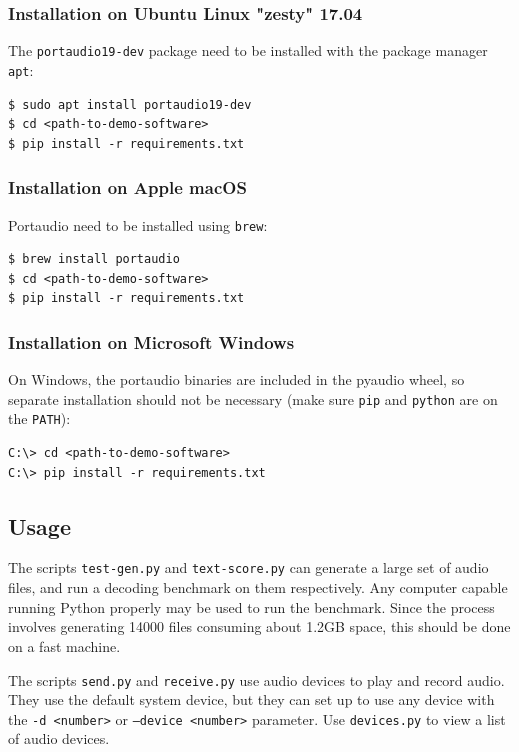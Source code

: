 \documentclass[a4paper]{article}
\begin{document}
\subsubsection{Installation on Ubuntu Linux "zesty" 17.04}

The \texttt{portaudio19-dev} package need to be installed with the 
package manager \texttt{apt}:

\begin{lstlisting}
$ sudo apt install portaudio19-dev
$ cd <path-to-demo-software>
$ pip install -r requirements.txt
\end{lstlisting}

\subsubsection{Installation on Apple macOS}

Portaudio need to be installed using \texttt{brew}:

\begin{lstlisting}
$ brew install portaudio
$ cd <path-to-demo-software>
$ pip install -r requirements.txt
\end{lstlisting}

\subsubsection{Installation on Microsoft Windows}

On Windows, the portaudio binaries are included in the pyaudio wheel, 
so separate installation should not be necessary (make sure 
\texttt{pip} and \texttt{python} are on the \texttt{PATH}):

\begin{lstlisting}
C:\> cd <path-to-demo-software>
C:\> pip install -r requirements.txt
\end{lstlisting}

\subsection{Usage}

The scripts \texttt{test-gen.py} and \texttt{text-score.py} can 
generate a large set of audio files, and run a decoding benchmark on 
them respectively. Any computer capable running Python properly may be 
used to run the benchmark. Since the process involves generating 14000 
files consuming about 1.2GB space, this should be done on a fast 
machine.

The scripts \texttt{send.py} and \texttt{receive.py} use audio devices 
to play and record audio. They use the default system device, but they 
can set up to use any device with the \texttt{-d <number>} or 
\texttt{--device <number>} parameter. Use \texttt{devices.py} to view a 
list of audio devices.
\end{document}
